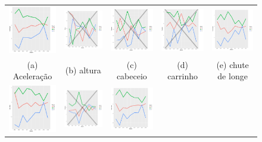 \documentclass[review]{elsarticle}
\begin{document}
\begin{figure}
\begin{tabular}{ccccc}
  \includegraphics[width=25mm]{aceleracao_result} & \includegraphics[width=25mm]{altura_result} & \includegraphics[width=25mm]{cabeceio_result} &   \includegraphics[width=25mm]{carrinho_result} &
  \includegraphics[width=25mm]{ch_delonge_result} \\
\scriptsize{(a) Aceleração } & \scriptsize{(b) altura  } & \scriptsize{(c) cabeceio } & \scriptsize{(d) carrinho } & \scriptsize{(e) chute de longe }\\[3pt]
\includegraphics[width=25mm]{cobr_falta_result} & \includegraphics[width=25mm]{combativ__result} &   \includegraphics[width=25mm]{contr_bola_result} &

\end{tabular}
\end{figure}
\end{document}
